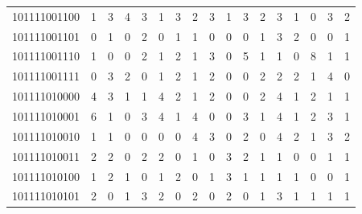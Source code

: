 \documentclass[10pt,a4paper]{article}
\begin{document}
\begin{longtable}{ |c|c|c|c|c|c|c|c|c|c|c|c|c|c|c|c|c| }
    101111001100              & 1                            & 3                                & 4                            & 3                              & 1   & 3   & 2   & 3   & 1   & 3   & 2   & 3   & 1   & 0   & 3   & 2   \\
    101111001101              & 0                            & 1                                & 0                            & 2                              & 0   & 1   & 1   & 0   & 0   & 0   & 1   & 3   & 2   & 0   & 0   & 1   \\
    101111001110              & 1                            & 0                                & 0                            & 2                              & 1   & 2   & 1   & 3   & 0   & 5   & 1   & 1   & 0   & 8   & 1   & 1   \\
    101111001111              & 0                            & 3                                & 2                            & 0                              & 1   & 2   & 1   & 2   & 0   & 0   & 2   & 2   & 2   & 1   & 4   & 0   \\
    101111010000              & 4                            & 3                                & 1                            & 1                              & 4   & 2   & 1   & 2   & 0   & 0   & 2   & 4   & 1   & 2   & 1   & 1   \\
    101111010001              & 6                            & 1                                & 0                            & 3                              & 4   & 1   & 4   & 0   & 0   & 3   & 1   & 4   & 1   & 2   & 3   & 1   \\
    101111010010              & 1                            & 1                                & 0                            & 0                              & 0   & 0   & 4   & 3   & 0   & 2   & 0   & 4   & 2   & 1   & 3   & 2   \\
    101111010011              & 2                            & 2                                & 0                            & 2                              & 2   & 0   & 1   & 0   & 3   & 2   & 1   & 1   & 0   & 0   & 1   & 1   \\
    101111010100              & 1                            & 2                                & 1                            & 0                              & 1   & 2   & 0   & 1   & 3   & 1   & 1   & 1   & 1   & 0   & 0   & 1   \\
    101111010101              & 2                            & 0                                & 1                            & 3                              & 2   & 0   & 2   & 0   & 2   & 0   & 1   & 3   & 1   & 1   & 1   & 1   \\

\end{longtable}
\end{document}
